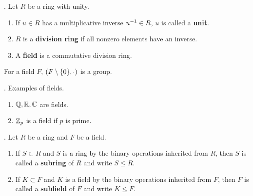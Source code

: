 . Let \(R\) be a ring with unity.
\begin{enumerate}
    \item {} If \(u \in R\) has a multiplicative inverse \(u ^{-1} \in R\), \(u\) is called a \textbf{unit}.
    \item {} \(R\) is a \textbf{division ring} if all nonzero elements have an inverse.
    \item {} A \textbf{field} is a commutative division ring.
\end{enumerate}

\rmk For a field \(F\), \((F \setminus \{0\}, \cdot)\) is a group.

\ex. Examples of fields.
\begin{enumerate}
    \item \(\mathbb{Q}, \mathbb{R}, \mathbb{C}\) are fields.
    \item \(\mathbb{Z}_p\) is a field if \(p\) is prime.
\end{enumerate}

. Let \(R\) be a ring and \(F\) be a field.
\begin{enumerate}
    \item {} If \(S \subset R\) and \(S\) is a ring by the binary operations inherited from \(R\), then \(S\) is called a \textbf{subring} of \(R\) and write \(S \leq R\).
    \item {} If \(K \subset F\) and \(K\) is a field by the binary operations inherited from \(F\), then \(F\) is called a \textbf{subfield} of \(F\) and write \(K \leq F\).
\end{enumerate}

\pagebreak
